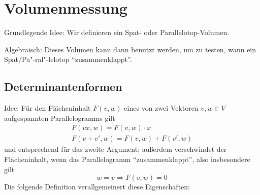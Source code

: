 \chapter{Volumenmessung}
	Grundlegende Idee: Wir definieren ein Spat- oder Parallelotop-Volumen.

	Algebraisch: Dieses Volumen kann dann benutzt werden, um zu testen, wann ein Spat/Pa"-ral"-lelotop "`zusammenklappt"'.
\section{Determinantenformen}
	Idee: Für den Flächeninhalt $ F(v,w) $ eines von zwei Vektoren $ v,w\in V $ aufgespannten Parallelogramms gilt
	\begin{gather*}
		F{(vx,w)} = F{(v,w)}\cdot x\\
		F(v+v',w) = F(v,w)+F(v',w)
	\end{gather*}
	und entsprechend für das zweite Argument; außerdem verschwindet der Flächeninhalt, wenn das Parallelogramm "`zusammenklappt"', also insbesondere gilt
		\[ w=v\Rightarrow F(v,w)=0 \]
	Die folgende Definition verallgemeinert diese Eigenschaften:


